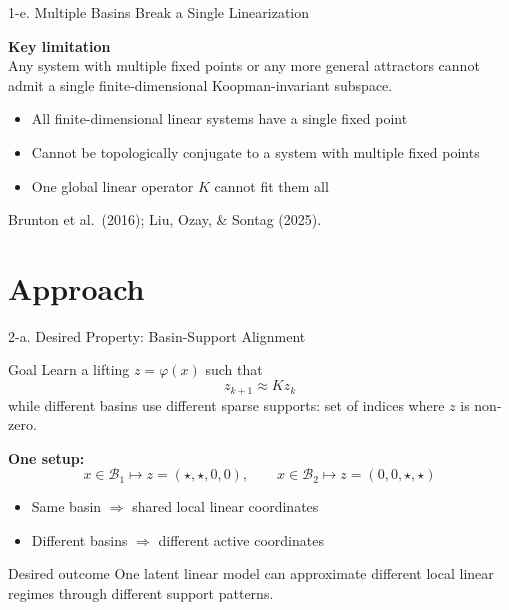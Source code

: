 \documentclass[aspectratio=169, 10pt]{beamer}
\begin{document}
\begin{frame}{1-e. Multiple Basins Break a Single Linearization}

\textbf{Key limitation}\\

Any system with multiple fixed points or any more general attractors cannot admit a single finite-dimensional Koopman-invariant subspace. 


\begin{itemize}
\item All finite-dimensional linear systems have a single fixed point
\item Cannot be topologically conjugate to a system with multiple fixed points
\item One global linear operator $K$ cannot fit them all
\end{itemize}


\vspace{1.2em}
\footnotesize
Brunton et al.\ (2016); Liu, Ozay, \& Sontag (2025).

\end{frame}

\section{Approach}

\begin{frame}{2-a. Desired Property: Basin-Support Alignment}

\begin{block}{Goal}
Learn a lifting $z = \varphi(x)$ such that
\[
z_{k+1} \approx K z_k
\]
while different basins use different sparse supports: set of indices where $z$ is non-zero.
\end{block}

\vspace{0.2em}

\textbf{One setup:}
\[
x \in \mathcal{B}_1 \mapsto z = (\star,\star,0,0), \qquad
x \in \mathcal{B}_2 \mapsto z = (0,0,\star,\star)
\]

\begin{itemize}
\item Same basin $\Rightarrow$ shared local linear coordinates
\item Different basins $\Rightarrow$ different active coordinates
\end{itemize}

\begin{exampleblock}{Desired outcome}
\vspace{0.1em}
One latent linear model can approximate different local linear regimes
through different support patterns.
\end{exampleblock}

\end{frame}
\end{document}
